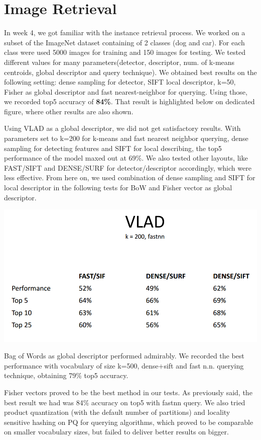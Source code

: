 \section{Image Retrieval}
	\indent    In week 4, we got familiar with the instance retrieval process. We worked on a subset of the ImageNet dataset containing of 2 classes (dog and car). For each class were used 5000 images for training and 150 images for testing. We tested different values for many parameters(detector, descriptor, num. of k-means centroids, global descriptor and query technique). We obtained best results on the following setting: dense sampling for detector, SIFT local descriptor, k=50, Fisher as global descriptor and fast nearest-neighbor for querying. Using those, we recorded top5 accuracy of \textbf{84\%}. That result is highlighted below on dedicated figure, where other results are also shown. 
\par	Using VLAD as a global descriptor, we did not get satisfactory results. With parameters set to k=200 for k-means and fast nearest neighbor querying, dense sampling for detecting features and SIFT for local describing, the top5 performance of the model maxed out at 69\%. We also tested other layouts, like FAST/SIFT and DENSE/SURF for detector/descriptor accordingly, which were less effective. From here on, we used combination of dense sampling and SIFT for local descriptor in the following tests for BoW and Fisher vector as global descriptor.

\centerline{\includegraphics[scale = 0.5]{figures/vlad.png}}

\par Bag of Words as global descriptor performed admirably. We recorded the best performance with vocabulary of size k=500, dense+sift and fast n.n. querying technique, obtaining 79\% top5 accuracy.
\par	Fisher vectors proved to be the best method in our tests. As previously said, the best result we had was 84\% accuracy on top5 with fastnn query. We also tried product quantization (with the default  number of partitions) and locality sensitive hashing on PQ for querying algorithms, which proved to be comparable on smaller vocabulary sizes, but failed to deliver better results on bigger.

